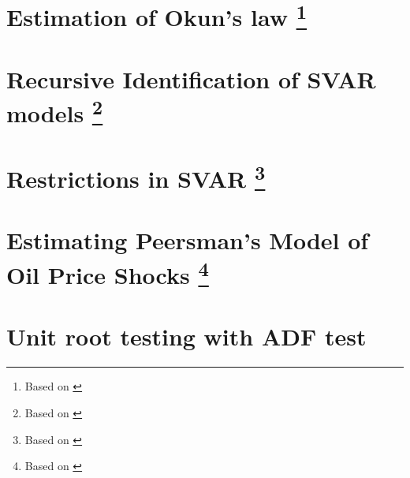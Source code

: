 \documentclass[11pt]{article}
\begin{document}
%
%
%
%
\section{Estimation of Okun's law\texorpdfstring{%
      \protect\footnote{Based on \cite{KissNguyenOesterholm-2023}}%
  }{}}
\label{ex-Okun_law-var}


\section{Recursive Identification of SVAR models\texorpdfstring{%
      \protect\footnote{Based on \cite[][see Section 29, ``Recursively Identified Models By Short-Run Restrictions"]{Mutschler-2018-github_repo}}%
  }{}}


\section{Restrictions in SVAR\texorpdfstring{ %
      \protect\footnote{Based on \cite{MartinHurnHarris-2012,Mutschler-2018-github_repo}} %
  }{}}



\section{Estimating Peersman's Model of Oil Price Shocks\texorpdfstring{ %
      \protect\footnote{Based on \cite{MartinHurnHarris-2012,Mutschler-2018-github_repo}} %
  }{}}



\section{Unit root testing with ADF test}




\clearpage
\printbibliography
\end{document}
